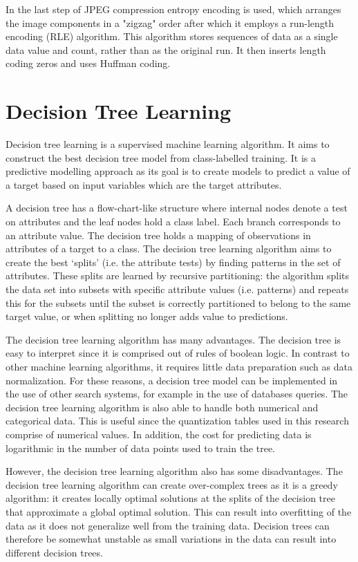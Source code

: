 In the last step of JPEG compression entropy encoding is used, which arranges the image components in a "zigzag" order after which it employs a run-length encoding (RLE) algorithm. This algorithm stores sequences of data as a single data value and count, rather than as the original run. It then inserts length coding zeros and uses Huffman coding.

\section{Decision Tree Learning}

Decision tree learning is a supervised machine learning algorithm. It aims to construct the best decision tree model from class-labelled training. It is a predictive modelling approach as its goal is to create models to predict a value of a target based on input variables which are the target attributes.

A decision tree has a flow-chart-like structure where internal nodes denote a test on attributes and the leaf nodes hold a class label. Each branch corresponds to an attribute value. The decision tree holds a mapping of observations in attributes of a target to a class. The decision tree learning algorithm aims to create the best `splits' (i.e. the attribute tests) by finding patterns in the set of attributes. These splits are learned by recursive partitioning: the algorithm splits the data set into subsets with specific attribute values (i.e. patterns) and repeats this for the subsets until the subset is correctly partitioned to belong to the same target value, or when splitting no longer adds value to predictions.

The decision tree learning algorithm has many advantages. The decision tree is easy to interpret since it is comprised out of rules of boolean logic. In contrast to other machine learning algorithms, it requires little data preparation such as data normalization. For these reasons, a decision tree model can be implemented in the use of other search systems, for example in the use of databases queries. The decision tree learning algorithm is also able to handle both numerical and categorical data. This is useful since the quantization tables used in this research comprise of numerical values. In addition, the cost for predicting data is logarithmic in the number of data points used to train the tree. 

However, the decision tree learning algorithm also has some disadvantages. The decision tree learning algorithm can create over-complex trees as it is a greedy algorithm: it creates locally optimal solutions at the splits of the decision tree that approximate a global optimal solution. This can result into overfitting of the data as it does not generalize well from the training data. Decision trees can therefore be somewhat unstable as small variations in the data can result into different decision trees. 






